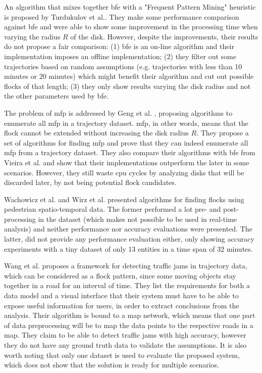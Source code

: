 An algorithm that mixes together \ac{bfe} \citep{vieira} with a "Frequent Pattern Mining" heuristic is proposed by
Turdukulov et al.. They make some performance comparison against \ac{bfe} and were able to show some improvement in the
processing time when varying the radius $R$ of the disk. However, despite the improvements, their results do not propose
a fair comparison: (1) \ac{bfe} is an on-line algorithm and their implementation imposes an offline implementation; (2)
they filter out some trajectories based on random assumptions (e.g. trajectories with less than 10 minutes or 20
minutes) which might benefit their algorithm and cut out possible flocks of that length; (3) they only show results
varying the disk radius and not the other parameters used by \ac{bfe}.

The problem of \ac{mfp} is addressed by Geng et al. \citep{enumeration}, proposing algorithms to enumerate all \ac{mfp}
in a trajectory dataset. \ac{mfp}, in other words, means that the flock cannot be extended without increasing the disk
radius $R$. They propose a set of algorithms for finding \ac{mfp} and prove that they can indeed enumerate all \ac{mfp}
from a trajectory dataset. They also compare their algorithms with \ac{bfe} from Vieira et al.  \citep{vieira} and show
that their implementations outperform the later in some scenarios. However, they still waste \ac{cpu} cycles by
analyzing disks that will be discarded later, by not being potential flock candidates.

Wachowicz et al. and Wirz et al. \citep{flockpedestrian} \citep{pedestriancanyons} presented algorithms for finding
flocks using pedestrian spatio-temporal data. The former performed a lot pre- and post-processing in the dataset (which
makes not possible to be used in real-time analysis) and neither performance nor accuracy evaluations were presented.
The latter, did not provide any performance evaluation either, only showing accuracy experiments with a tiny dataset of
only 13 entities in a time span of 32 minutes.

Wang et al. \citep{visualtrafficjam} proposes a framework for detecting traffic jams in trajectory data, which can be
considered as a flock pattern, since some moving objects stay together in a road for an interval of time. They list the
requirements for both a data model and a visual interface that their system must have to be able to expose useful
information for users, in order to extract conclusions from the analysis. Their algorithm is bound to a map network,
which means that one part of data preprocessing will be to map the data points to the respective roads in a map. They
claim to be able to detect traffic jams with high accuracy, however they do not have any ground truth data to validate
the assumptions. It is also worth noting that only one dataset is used to evaluate the proposed system, which does not
show that the solution is ready for multiple scenarios.

